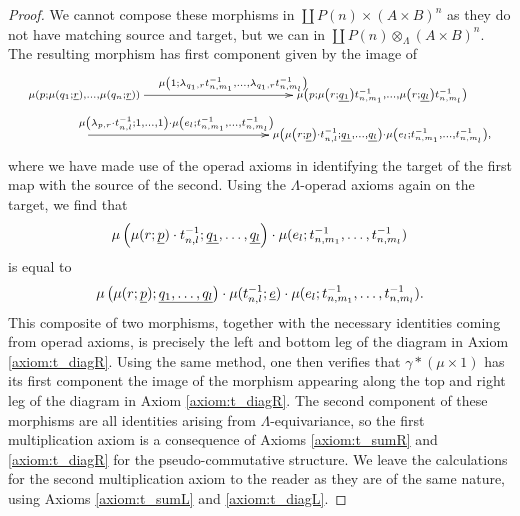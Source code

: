 \begin{proof}
We cannot compose these morphisms in $\coprod P(n) \times (A \times B)^{n}$ as they do not have matching source and target, but we can in $\coprod P(n) \otimes_{\Lambda} (A \times B)^{n}$. The resulting morphism has first component given by the image of
  \[
    \xy
      {\ar^{\scriptstyle \mu\left(1; \lambda_{q_{1}, r} t^{-1}_{n,m_{1}}, \ldots, \lambda_{q_{1}, r} t^{-1}_{n,m_{l}}\right)} (0,0)*+{\scriptstyle \mu\left(p; \mu\left(q_{1}; \un{r}\right), \ldots, \mu\left(q_{n}; \un{r}\right)\right)}; (75,0)*+{\scriptstyle \mu\left(p; \mu\left(r; \un{q_{1}}\right) t^{-1}_{n,m_{1}}, \ldots, \mu\left(r; \un{q_{l}}\right) t^{-1}_{n,m_{l}} \right)} };
      {\ar^<<<<<<<<<<<<<<<<<<<<<<{\scriptstyle \mu\left(\lambda_{p,r} \cdot t^{-1}_{n,l}; 1, \ldots, 1\right)\cdot \mu\left(e_{l}; t^{-1}_{n,m_{1}}, \ldots, t^{-1}_{n,m_{l}}\right)} (0,-10)*+{}; (75,-10)*+{\scriptstyle \mu\left(\mu\left(r; \un{p}\right)\cdot t^{-1}_{n,l}; \un{q_{1}}, \ldots, \un{q_{l}}\right)\cdot \mu\left(e_{l}; t^{-1}_{n,m_{1}}, \ldots, t^{-1}_{n,m_{l}}\right),} }
    \endxy
  \]
where we have made use of the operad axioms in identifying the target of the first map with the source of the second. Using the $\Lambda$-operad axioms again on the target, we find that
  \[
    \mu\left(\mu(r; \underline{p})\cdot t^{-1}_{n,l}; \underline{q_{1}}, \ldots, \underline{q_{l}}\right)\cdot \mu(e_{l}; t^{-1}_{n,m_{1}}, \ldots, t^{-1}_{n,m_{l}})
  \]
is equal to
  \[
    \mu\left(\mu(r; \underline{p}); \underline{q_{1}, \ldots, q_{l}}\right) \cdot \mu(t^{-1}_{n,l}; \underline{e}) \cdot \mu(e_{l}; t^{-1}_{n,m_{1}}, \ldots, t^{-1}_{n,m_{l}}).
  \]
This composite of two morphisms, together with the necessary identities coming from operad axioms, is precisely the left and bottom leg of the diagram in Axiom \eqref{axiom:t_diagR}. Using the same method, one then verifies that $\gamma * (\mu \times 1)$ has its first component the image of the morphism appearing along the top and right leg of the diagram in Axiom \eqref{axiom:t_diagR}. The second component of these morphisms are all identities arising from $\Lambda$-equivariance, so the first multiplication axiom is a consequence of Axioms \eqref{axiom:t_sumR} and \eqref{axiom:t_diagR} for the pseudo-commutative structure. We leave the calculations for the second multiplication axiom to the reader as they are of the same nature, using Axioms \eqref{axiom:t_sumL} and \eqref{axiom:t_diagL}.
\end{proof}


